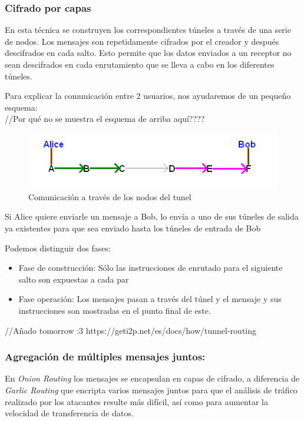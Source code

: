 \subsubsection*{Cifrado por capas}

En esta técnica se construyen los correspondientes túneles a través de una serie de nodos.
Los mensajes son repetidamente cifrados por el creador y después descifrados en cada salto. Esto permite que los datos enviados a un receptor no sean descifrados en cada enrutamiento que se lleva a cabo en los diferentes túneles. 

Para explicar la comunicación entre 2 usuarios, nos ayudaremos de un pequeño esquema: \\

//Por qué no se muestra el esquema de arriba aquí???? \\

	
\begin{figure}
	\centering
	\includegraphics[width=.8\textwidth]{img/alice_bob_tunnel}
	\caption{Comunicación a través de los nodos del tunel}
\end{figure}

Si Alice quiere enviarle un mensaje a Bob, lo envía a uno de sus túneles de salida ya existentes para que sea enviado hasta los túneles de entrada de Bob

Podemos distinguir dos fases:

\begin{itemize}
\item Fase de construcción: Sólo las instrucciones de enrutado para el siguiente salto son expuestas a cada par
\item 
Fase  operación: Los mensajes pasan a través del túnel y el mensaje y sus instrucciones son mostradas en el punto final de este.
	
\end{itemize}
	
//Añado tomorrow :3
https://geti2p.net/es/docs/how/tunnel-routing
	
	

\subsubsection*{Agregación de múltiples mensajes juntos:}
En \textit{Onion Routing} los mensajes se encapsulan en capas de cifrado, a diferencia de \textit{Garlic Routing} que encripta varios mensajes juntos para que el análisis de tráfico realizado por los atacantes resulte más difícil, así como para aumentar la velocidad de transferencia de datos.

